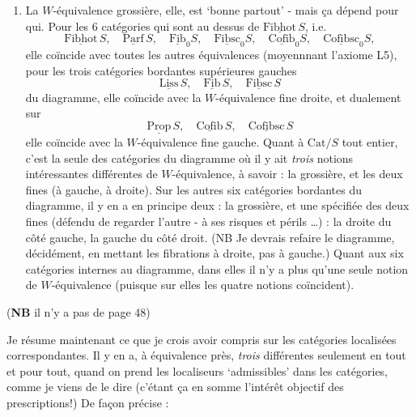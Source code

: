 \documentclass[11pt]{article}
\newcommand{\printedpage}[1]{\marginpar{\footnotesize p.~#1}}
\newcommand{\msp}[1]{\marginpar{\footnotesize [#1]}}
\newcommand{\uc}[1]{\underline{\mathrm{#1}}}
\newcommand{\Cat}{\mathrm{Cat}}
\begin{document}
\begin{enumerate}[leftmargin=*]
\item[3)] La $W$-équivalence grossière, elle, est `bonne partout' - mais ça dépend pour qui. Pour les 6 catégories qui sont au dessus de $\uc{Fibhot}\,S$, i.e.
\[
\uc{Fibhot}\,S,\quad \uc{Parf}\,S,\quad \uc{Fib}_0S,\quad \uc{Fibsc}_0S,\quad \uc{Cofib}_0S,\quad \uc{Cofibsc}_0S,
\]
\printedpage{30}
elle coïncide avec toutes les autres équivalences (moyennnant l'axiome L5), pour les trois catégories bordantes supérieures gauches %
\[
\uc{Liss}\,S,\quad \uc{Fib}\,S,\quad \uc{Fibsc}\,S
\]
du diagramme, elle coïncide avec la $W$-équivalence fine droite, et dualement sur
\[
\uc{Prop}\,S,\quad \uc{Cofib}\,S,\quad \uc{Cofibsc}\,S
\]
elle coïncide avec la $W$-équivalence fine gauche. Quant à $\Cat/S$ tout entier, c'est la seule des catégories du diagramme où il y ait \textit{trois} notions intéressantes différentes de $W$-équivalence, à savoir : la grossière, et les deux fines (à gauche, à droite). Sur les autres six catégories bordantes du diagramme, il y en a en principe deux : la grossière, et une spécifiée des deux fines (défendu de regarder l'autre - à ses risques et périls \ldots) : la droite du côté gauche, la gauche du côté droit. (NB Je devrais refaire le diagramme, décidément, en mettant les fibrations à droite, pas à gauche.) Quant aux six catégories internes au diagramme, dans elles il n'y a plus qu'une seule notion de $W$-équivalence (puisque sur elles les quatre notions coïncident).
\end{enumerate}

\msp{page 48: blank}

\msp{page 49} (\textbf{NB} il n'y a pas de page 48)

Je résume maintenant ce que je crois avoir compris sur les catégories localisées correspondantes. Il y en a, à équivalence près, \textit{trois} différentes seulement en tout et pour tout, quand on prend les localiseurs `admissibles' dans les catégories, comme je viens de le dire (c'étant ça en somme l'intérêt objectif des prescriptions!) De façon précise :
\end{document}

